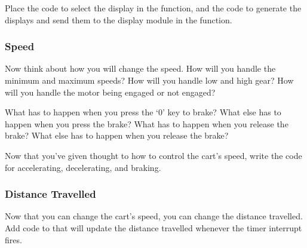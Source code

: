 Place the code to select the display in the  function, and the code to generate the displays and send them to the display module in the  function.

\subsubsection{Speed}

Now think about how you will change the speed.
How will you handle the minimum and maximum speeds?
How will you handle low and high gear?
How will you handle the motor being engaged or not engaged?

What has to happen when you press the `0' key to brake?
What else has to happen when you press the brake?
What has to happen when you release the brake?
What else has to happen when you release the brake?


Now that you've given thought to how to control the cart's speed, write the code for accelerating, decelerating, and braking.

\subsubsection{Distance Travelled}

Now that you can change the cart's speed, you can change the distance travelled.
Add code to  that will update the distance travelled whenever the timer interrupt fires.



